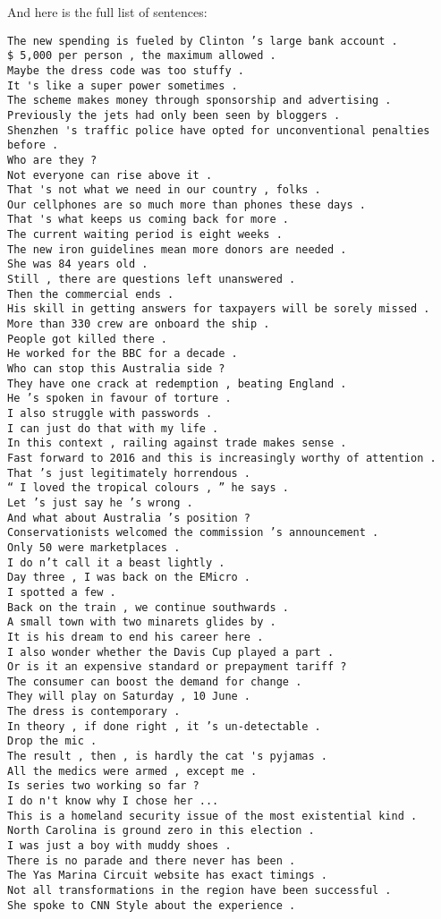 And here is the full list of sentences:
\begin{verbatim}
The new spending is fueled by Clinton ’s large bank account .
$ 5,000 per person , the maximum allowed .
Maybe the dress code was too stuffy .
It 's like a super power sometimes .
The scheme makes money through sponsorship and advertising .
Previously the jets had only been seen by bloggers .
Shenzhen 's traffic police have opted for unconventional penalties before .
Who are they ?
Not everyone can rise above it .
That 's not what we need in our country , folks .
Our cellphones are so much more than phones these days .
That 's what keeps us coming back for more .
The current waiting period is eight weeks .
The new iron guidelines mean more donors are needed .
She was 84 years old .
Still , there are questions left unanswered .
Then the commercial ends .
His skill in getting answers for taxpayers will be sorely missed .
More than 330 crew are onboard the ship .
People got killed there .
He worked for the BBC for a decade .
Who can stop this Australia side ?
They have one crack at redemption , beating England .
He ’s spoken in favour of torture .
I also struggle with passwords .
I can just do that with my life .
In this context , railing against trade makes sense .
Fast forward to 2016 and this is increasingly worthy of attention .
That ’s just legitimately horrendous .
“ I loved the tropical colours , ” he says .
Let ’s just say he ’s wrong .
And what about Australia ’s position ?
Conservationists welcomed the commission ’s announcement .
Only 50 were marketplaces .
I do n’t call it a beast lightly .
Day three , I was back on the EMicro .
I spotted a few .
Back on the train , we continue southwards .
A small town with two minarets glides by .
It is his dream to end his career here .
I also wonder whether the Davis Cup played a part .
Or is it an expensive standard or prepayment tariff ?
The consumer can boost the demand for change .
They will play on Saturday , 10 June .
The dress is contemporary .
In theory , if done right , it ’s un-detectable .
Drop the mic .
The result , then , is hardly the cat 's pyjamas .
All the medics were armed , except me .
Is series two working so far ?
I do n't know why I chose her ...
This is a homeland security issue of the most existential kind .
North Carolina is ground zero in this election .
I was just a boy with muddy shoes .
There is no parade and there never has been .
The Yas Marina Circuit website has exact timings .
Not all transformations in the region have been successful .
She spoke to CNN Style about the experience .

\end{verbatim}
